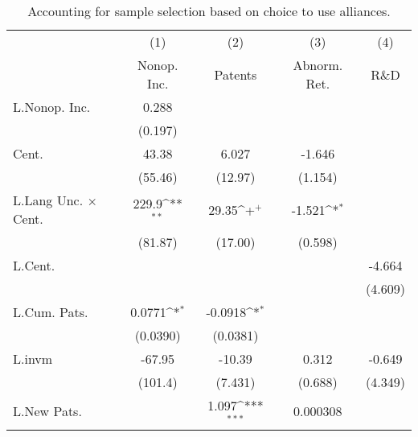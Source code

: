 \begin{table}
\begin{center}
\caption[Sample Selection on Alliance Use]{Accounting for sample selection based on choice to use alliances.\label{sel2}}
\vspace{0.3in}
{
\def\sym#1{\ifmmode^{#1}\else\(^{#1}\)\fi}
\begin{tabular}{l*{4}{c}}
\hline\hline
                    &\multicolumn{1}{c}{(1)}&\multicolumn{1}{c}{(2)}&\multicolumn{1}{c}{(3)}&\multicolumn{1}{c}{(4)}\\
                    &\multicolumn{1}{c}{Nonop. Inc.}&\multicolumn{1}{c}{Patents}&\multicolumn{1}{c}{Abnorm. Ret.}&\multicolumn{1}{c}{R\&D}\\
\hline
L.Nonop. Inc.       &       0.288         &                     &                     &                     \\
                    &     (0.197)         &                     &                     &                     \\
Cent.               &       43.38         &       6.027         &      -1.646         &                     \\
                    &     (55.46)         &     (12.97)         &     (1.154)         &                     \\
L.Lang Unc. $\times$ Cent.&       229.9\sym{**} &       29.35\sym{+}  &      -1.521\sym{*}  &                     \\
                    &     (81.87)         &     (17.00)         &     (0.598)         &                     \\
L.Cent.             &                     &                     &                     &      -4.664         \\
                    &                     &                     &                     &     (4.609)         \\
L.Cum. Pats.        &      0.0771\sym{*}  &     -0.0918\sym{*}  &                     &                     \\
                    &    (0.0390)         &    (0.0381)         &                     &                     \\
L.invm              &      -67.95         &      -10.39         &       0.312         &      -0.649         \\
                    &     (101.4)         &     (7.431)         &     (0.688)         &     (4.349)         \\
L.New Pats.         &                     &       1.097\sym{***}&    0.000308         &                     \\

\end{tabular}}
\end{center}
\end{table}
